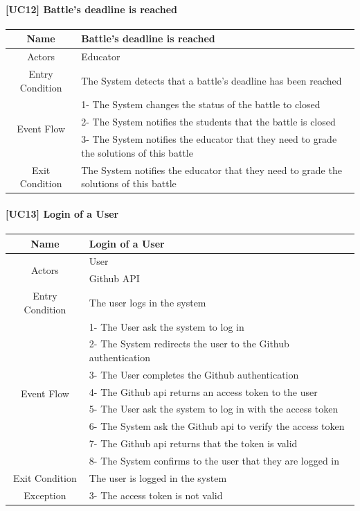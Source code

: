 \documentclass{article}
\begin{document}
\newpage
\paragraph{[UC12] Battle's deadline is reached}
\begin{center}
\begin{tabular}{|c|m{40em}|}
\hline
Name & Battle's deadline is reached\\
\hline
\multirow{1}{4em}{Actors}
& Educator\\
\hline
Entry Condition & The System detects that a battle's deadline has been reached\\
\hline
\multirow{3}{4em}{Event Flow}
&1- The System changes the status of the battle to closed\\
&2- The System notifies the students that the battle is closed\\
&3- The System notifies the educator that they need to grade the solutions of this battle\\
\hline
Exit Condition & The System notifies the educator that they need to grade the solutions of this battle\\
\hline
\end{tabular}
\end{center}

\paragraph{[UC13] Login of a User}
\begin{center}
\begin{tabular}{|c|m{40em}|}
\hline
Name & Login of a User\\
\hline
\multirow{2}{4em}{Actors}
& User\\
& Github API\\
\hline
Entry Condition & The user logs in the system\\
\hline
\multirow{8}{4em}{Event Flow}
& 1- The User ask the system to log in\\
& 2- The System redirects the user to the Github authentication\\
& 3- The User completes the Github authentication\\
& 4- The Github api returns an access token to the user\\
& 5- The User ask the system to log in with the access token\\
& 6- The System ask the Github api to verify the access token\\
& 7- The Github api returns that the token is valid\\
& 8- The System confirms to the user that they are logged in\\
\hline
Exit Condition & The user is logged in the system\\
\hline
Exception & 3- The access token is not valid\\
\hline
\end{tabular}
\end{center}
\newpage
\end{document}
